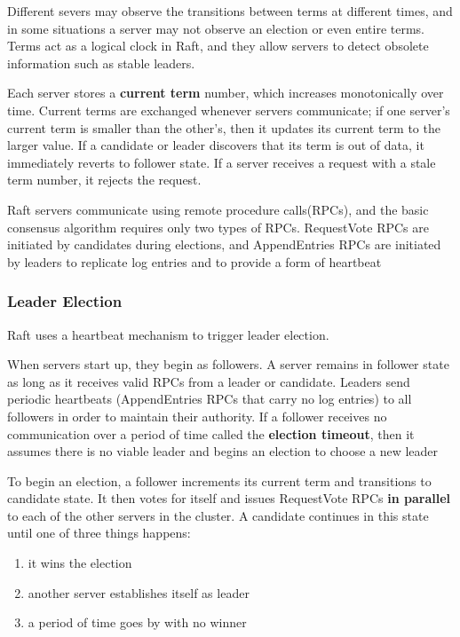 \documentclass[11pt]{article}
\begin{document}
Different severs may observe the transitions between terms at different times, and in some
situations a server may not observe an election or even entire terms. Terms act as a logical
clock in Raft, and they allow servers to detect obsolete information such as stable leaders.

Each server stores a \textbf{current term} number, which increases monotonically over time. Current terms
are exchanged whenever servers communicate; if one server's current term is smaller than the
other's, then it updates its current term to the larger value. If a candidate or leader
discovers that its term is out of data, it immediately reverts to follower state. If a server
receives a request with a stale term number, it rejects the request.

Raft servers communicate using remote procedure calls(RPCs), and the basic consensus algorithm
requires only two types of RPCs. RequestVote RPCs are initiated by candidates during elections,
and AppendEntries RPCs are initiated by leaders to replicate log entries and to provide a form
of heartbeat
\subsubsection{Leader Election}
\label{sec:orgacd9155}
Raft uses a heartbeat mechanism to trigger leader election.

When servers start up, they begin as followers. A server remains in follower state as long as it
receives valid RPCs from a leader or candidate. Leaders send periodic heartbeats (AppendEntries
RPCs that carry no log entries) to all followers in order to maintain their authority. If a
follower receives no communication over a period of time called the \textbf{election timeout}, then it
assumes there is no viable leader and begins an election to choose a new leader

To begin an election, a follower increments its current term and transitions to candidate state.
It then votes for itself and issues RequestVote RPCs \textbf{in parallel} to each of the other servers in
the cluster. A candidate continues in this state until one of three things happens:
\begin{enumerate}
\item it wins the election
\item another server establishes itself as leader
\item a period of time goes by with no winner
\end{enumerate}
\end{document}
